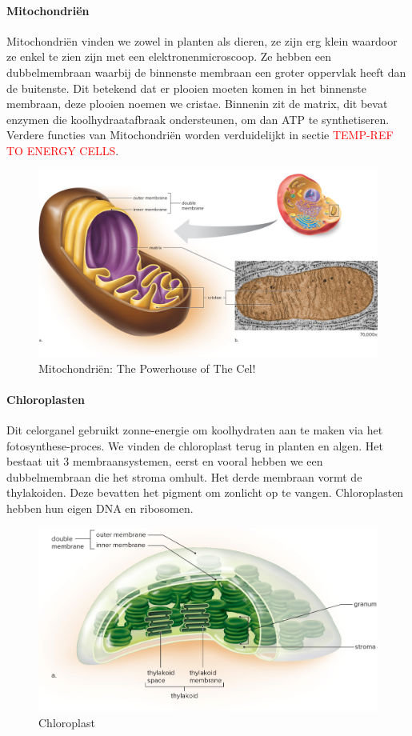 \documentclass[a4paper,kul]{kulakarticle} %
\begin{document}
\paragraph{Mitochondriën}
Mitochondriën vinden we zowel in planten als dieren, ze zijn erg klein waardoor ze enkel te zien zijn met een elektronenmicroscoop. Ze hebben een dubbelmembraan waarbij de binnenste membraan een groter oppervlak heeft dan de buitenste. Dit betekend dat er plooien moeten komen in het binnenste membraan, deze plooien noemen we cristae. Binnenin zit de matrix, dit bevat enzymen die koolhydraatafbraak ondersteunen, om dan ATP te synthetiseren. Verdere functies van Mitochondriën worden verduidelijkt in sectie \textcolor{red}{TEMP-REF TO ENERGY CELLS}.
\begin{figure}[h!]
	\centering
	\includegraphics[width=0.7\linewidth]{PowerhouseOfTheCell}
	\caption[Mitochondria]{Mitochondriën: The Powerhouse of The Cel!}
	\label{fig:powerhouseofthecell}
\end{figure}
\newpage
\paragraph{Chloroplasten}
Dit celorganel gebruikt zonne-energie om koolhydraten aan te maken via het fotosynthese-proces. We vinden de chloroplast terug in planten en algen. Het bestaat uit 3 membraansystemen, eerst en vooral hebben we een dubbelmembraan die het stroma omhult. Het derde membraan vormt de thylakoiden. Deze bevatten het pigment om zonlicht op te vangen. Chloroplasten hebben hun eigen DNA en ribosomen.  
\begin{figure}[h]
	\centering
	\includegraphics[width=0.7\linewidth]{Chloroplast}
	\caption[Chloroplast]{Chloroplast}
	\label{fig:chloroplast}
\end{figure}
\newpage
\end{document}

